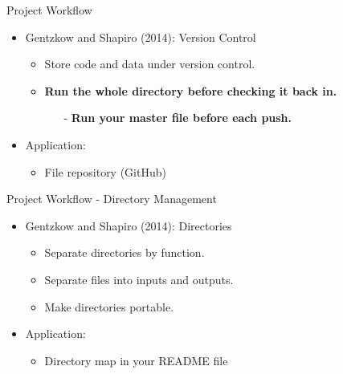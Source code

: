\documentclass{beamer}
\begin{document}
\begin{frame}{Project Workflow}
    \begin{itemize}
        \item Gentzkow and Shapiro (2014): Version Control
            \begin{itemize}
                \item Store code and data under version control.
                \item \textbf{Run the whole directory before checking it back in.}
                    \begin{itemize}
                        \item[-] \textbf{Run your master file before each push.} 
                    \end{itemize}
            \end{itemize}
        \item Application:
            \begin{itemize}
                \item File repository (GitHub)
            \end{itemize}
    \end{itemize}
\end{frame}

\begin{frame}{Project Workflow - Directory Management}
    \begin{itemize}
        \item Gentzkow and Shapiro (2014): Directories
            \begin{itemize}
                \item Separate directories by function.
                \item Separate files into inputs and outputs.
                \item Make directories portable.
            \end{itemize}
        \item Application:
            \begin{itemize}
                \item Directory map in your README file
            \end{itemize}
    \end{itemize}
\end{frame}
\end{document}
